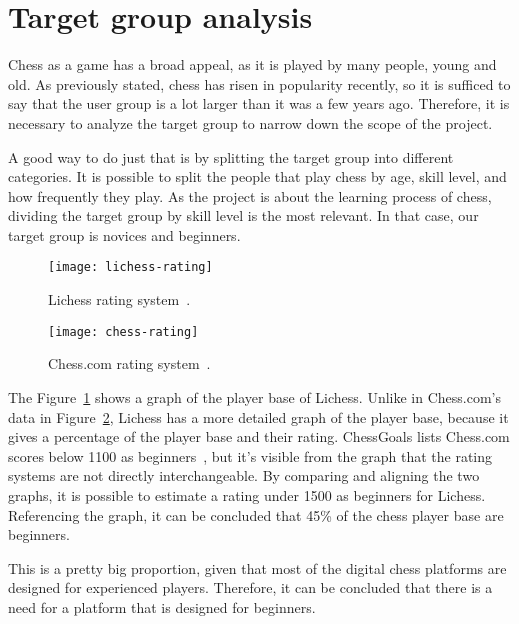 \section{Target group analysis}\label{sec:target-group-analysis}

Chess as a game has a broad appeal, as it is played by many people, young and old.
As previously stated, chess has risen in popularity recently, so it is sufficed to say that the user group is a lot
larger than it was a few years ago.
Therefore, it is necessary to analyze the target group to narrow down the scope of the project.

A good way to do just that is by splitting the target group into different categories.
It is possible to split the people that play chess by age, skill level, and how frequently they play.
As the project is about the learning process of chess, dividing the target group by skill level is the most relevant.
In that case, our target group is novices and beginners.

\begin{figure}
    \centering
    \texttt{[image: lichess-rating]}
    \caption{Lichess rating system~\cite{chess-ratings}.}\label{fig:lichess-rating}
\end{figure}

\begin{figure}
    \centering
    \texttt{[image: chess-rating]}
    \caption{Chess.com rating system~\cite{chess-ratings}.}\label{fig:chess.com-rating}
\end{figure}


The Figure~\ref{fig:lichess-rating} shows a graph of the player base of Lichess.
Unlike in Chess.com's data in Figure~\ref{fig:chess.com-rating}, Lichess has a more detailed graph of the player base,
because it gives a percentage of the player base and their rating.
ChessGoals lists Chess.com scores below 1100 as beginners~\cite{chess-ratings}, but it's visible from the graph that
the rating systems are not directly interchangeable.
By comparing and aligning the two graphs, it is possible to estimate a rating under 1500 as beginners for Lichess.
Referencing the graph, it can be concluded that 45\% of the chess player base are beginners.

This is a pretty big proportion, given that most of the digital chess platforms are designed for experienced players.
Therefore, it can be concluded that there is a need for a platform that is designed for beginners.
